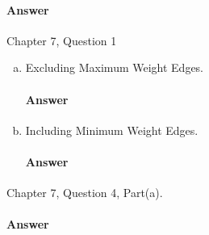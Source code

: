 \documentclass{article}
\begin{document}
\paragraph{Answer}
\todo{}

\collab{\todo{}}

Chapter 7, Question 1

\begin{enumerate}[(a)]

    \item Excluding Maximum Weight Edges.

        \paragraph{Answer}
        \todo{}


    \item Including Minimum Weight Edges.

        \paragraph{Answer}
        \todo{}

\end{enumerate}


\collab{\todo{}}

Chapter 7, Question 4, Part(a).

\paragraph{Answer}
\todo{}
\end{document}
